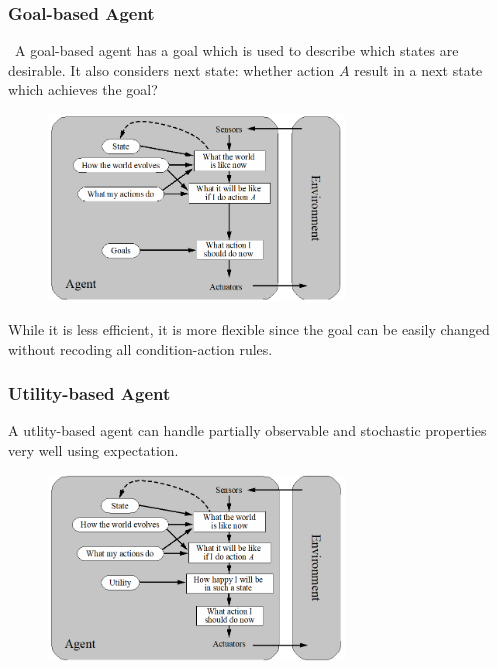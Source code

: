 \documentclass[12pt]{article}
\theoremstyle{definition}
\begin{document}
\subsubsection{Goal-based Agent}\
A goal-based agent has a goal which is used to describe which states are desirable. It also considers next state: whether action $A$ result in a next state which achieves the goal?
\begin{figure}[h]
\centering
\includegraphics[width = 0.7\textwidth]{2_3.png}
\end{figure}
While it is less efficient, it is more flexible since the goal can be easily changed without recoding all condition-action rules.
\subsubsection{Utility-based Agent}
A utlity-based agent can handle partially observable and stochastic properties very well using expectation.
\begin{figure}[h]
\centering
\includegraphics[width = 0.7\textwidth]{2_4.png}
\end{figure}
\end{document}
